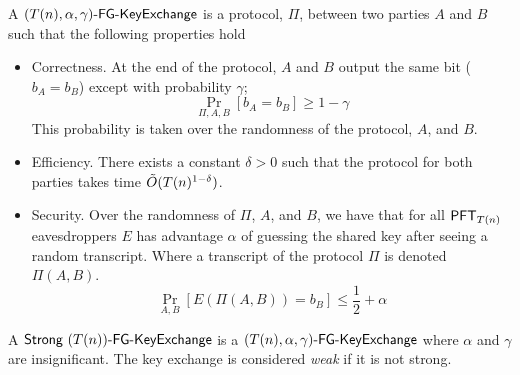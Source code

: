 \begin{definition}\label{def:fgkeyxc}
	A $\fgkeyxc{T(n)}{\alpha}{\gamma}$ is a protocol, $\Pi$, between two parties $A$ and $B$ such that the following properties hold
	\begin{itemize}
		\item Correctness. At the end of the protocol, $A$ and $B$ output the same bit ($b_A = b_B$) except with probability $\gamma$;
		\[ \Pr_{\Pi, A, B}[b_A = b_B] \ge 1 - \gamma \]
		This probability is taken over the randomness of the protocol, $A$, and $B$.
		
		\item Efficiency. There exists a constant $\delta > 0$ such that the protocol for both parties takes time $\~O(T(n)^{1 - \delta})$.
		
		\item Security. Over the randomness of $\Pi$, $A$, and $B$, we have that for all $\PFT{T(n)}$ eavesdroppers $E$ has advantage $\alpha$ of guessing the shared key after seeing a random transcript.  Where a transcript of the protocol $\Pi$ is denoted $\Pi(A,B)$.
		\[ \Pr_{A,B}[E(\Pi(A,B)) = b_B] \le \frac 1 2 + \alpha \]
	\end{itemize}
	A $\strongfgkeyxc{T(n)}$ is a $\fgkeyxc{T(n)}{\alpha}{\gamma}$ where $\alpha$ and $\gamma$ are insignificant. The key exchange is considered \emph{weak} if it is not strong.
\end{definition}



